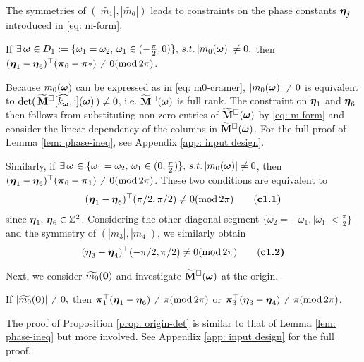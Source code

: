 The symmetries of $(|\widetilde{m_1}|, |\widetilde{m_6}|)$ leads to constraints on the phase constants $\boldsymbol{\eta}_j$ introduced in \eqref{eq: m-form}.
 
\begin{lemma}\label{lem: phase-ineq}
If $\exists\,\boldsymbol{\omega}\in D_1:=\{\omega_1=\omega_2,\,\omega_1\in(-\frac{\pi}{2},0)\},\,s.t. \,|m_0(\boldsymbol{\omega})|\neq 0,$ then $(\boldsymbol{\eta}_1-\boldsymbol{\eta}_6)^\top (\boldsymbol{\pi}_6-\boldsymbol{\pi}_7)\neq 0(\text{mod}\,2\pi)$. 
\end{lemma} 

Because $m_0(\boldsymbol{\omega})$ can be expressed as in \eqref{eq: m0-cramer}, $|m_0(\boldsymbol{\omega})|\neq 0$ is equivalent to $\det(\,\widetilde{\mathbf{M}}^{\Box}[\widehat{k_{\boldsymbol{\omega}}},:](\boldsymbol{\omega})\,)\neq 0$, i.e. $\widetilde{\mathbf{M}}^{\Box}(\boldsymbol{\omega})$ is full rank. The constraint on $\boldsymbol{\eta}_1$ and $\boldsymbol{\eta}_6$ then follows from substituting non-zero entries of $\widetilde{\mathbf{M}}^{\Box}(\boldsymbol{\omega})$ by \eqref{eq: m-form} and consider the linear dependency of the columns in $\widetilde{\mathbf{M}}^{\Box}(\boldsymbol{\omega})$. For the full proof of Lemma \ref{lem: phase-ineq}, see Appendix \ref{app: input design}.

Similarly, if $\exists\,\boldsymbol{\omega}\in \{\omega_1 = \omega_2,\, \omega_1\in(0,\frac{\pi}{2})\},\, s.t.\, |m_0(\boldsymbol{\omega})| \neq 0$, then $(\boldsymbol{\eta}_1-\boldsymbol{\eta}_6)^\top (\boldsymbol{\pi}_6-\boldsymbol{\pi}_1)\neq 0(\text{mod}\,2\pi)$. These two conditions are equivalent to 
\begin{align*}
(\boldsymbol{\eta}_1-\boldsymbol{\eta}_6)^\top(\pi/2,\pi/2)\neq 0 (\text{mod}\,2\pi)\tag{\bf c1.1}
\end{align*}
since $\boldsymbol{\eta}_1,\,\boldsymbol{\eta}_6\in\mathbb{Z}^2$.
Considering the other diagonal segment $\{\omega_2 = -\omega_1, |\omega_1| <\frac{\pi}{2}\}$ and the symmetry of $(|\widetilde{m_3}|, |\widetilde{m_4}|)$, we similarly obtain
\begin{align*}
(\boldsymbol{\eta}_3-\boldsymbol{\eta}_4)^\top(-\pi/2,\pi/2)\neq 0 (\text{mod}\, 2\pi)\tag{\bf c1.2}
\end{align*}

Next, we consider $\widetilde{m_0}(\boldsymbol{0})$ and investigate $\widetilde{\mathbf{M}}^{\Box}(\boldsymbol{\omega})$ at the origin.
\begin{proposition}\label{prop: origin-det}
If $|\widetilde{m_0}(\boldsymbol{0})|\neq 0,$ then $\boldsymbol{\pi}_1^\top(\boldsymbol{\eta}_1-\boldsymbol{\eta}_6)\neq \pi(\text{mod}\,2\pi)$ or $\boldsymbol{\pi}_3^\top(\boldsymbol{\eta}_3-\boldsymbol{\eta}_4)\neq \pi(\text{mod}\,2\pi)$. 
\end{proposition}
The proof of Proposition \ref{prop: origin-det} is similar to that of Lemma \ref{lem: phase-ineq} but more involved. See Appendix \ref{app: input design} for the full proof.

